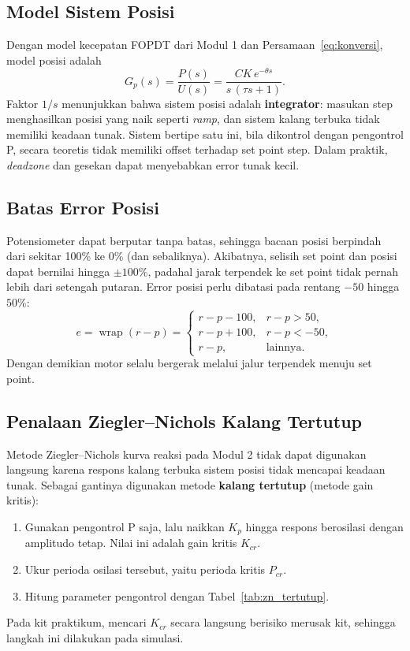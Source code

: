 \documentclass[11pt,a4paper]{article}
\begin{document}
\subsection{Model Sistem Posisi}
Dengan model kecepatan FOPDT dari Modul 1 dan Persamaan~\eqref{eq:konversi}, model posisi adalah
\begin{equation}
G_p(s) = \frac{P(s)}{U(s)} = \frac{C K\,e^{-\theta s}}{s\,(\tau s + 1)}.
\label{eq:model_posisi}
\end{equation}
Faktor $1/s$ menunjukkan bahwa sistem posisi adalah \textbf{integrator}: masukan step menghasilkan posisi yang naik seperti \textit{ramp}, dan sistem kalang terbuka tidak memiliki keadaan tunak. Sistem bertipe satu ini, bila dikontrol dengan pengontrol P, secara teoretis tidak memiliki offset terhadap set point step. Dalam praktik, \textit{deadzone} dan gesekan dapat menyebabkan error tunak kecil.

\subsection{Batas Error Posisi}
Potensiometer dapat berputar tanpa batas, sehingga bacaan posisi berpindah dari sekitar 100\% ke 0\% (dan sebaliknya). Akibatnya, selisih set point dan posisi dapat bernilai hingga $\pm 100\%$, padahal jarak terpendek ke set point tidak pernah lebih dari setengah putaran. Error posisi perlu dibatasi pada rentang $-50$ hingga $50\%$:
\begin{equation}
e = \operatorname{wrap}(r - p) =
\begin{cases}
r - p - 100, & r - p > 50, \\
r - p + 100, & r - p < -50, \\
r - p, & \text{lainnya}.
\end{cases}
\label{eq:wrap}
\end{equation}
Dengan demikian motor selalu bergerak melalui jalur terpendek menuju set point.

\subsection{Penalaan Ziegler--Nichols Kalang Tertutup}
Metode Ziegler--Nichols kurva reaksi pada Modul 2 tidak dapat digunakan langsung karena respons kalang terbuka sistem posisi tidak mencapai keadaan tunak. Sebagai gantinya digunakan metode \textbf{kalang tertutup} (metode gain kritis):
\begin{enumerate}
\item Gunakan pengontrol P saja, lalu naikkan $K_p$ hingga respons berosilasi dengan amplitudo tetap. Nilai ini adalah gain kritis $K_{cr}$.
\item Ukur perioda osilasi tersebut, yaitu perioda kritis $P_{cr}$.
\item Hitung parameter pengontrol dengan Tabel~\ref{tab:zn_tertutup}.
\end{enumerate}
Pada kit praktikum, mencari $K_{cr}$ secara langsung berisiko merusak kit, sehingga langkah ini dilakukan pada simulasi.
\end{document}
